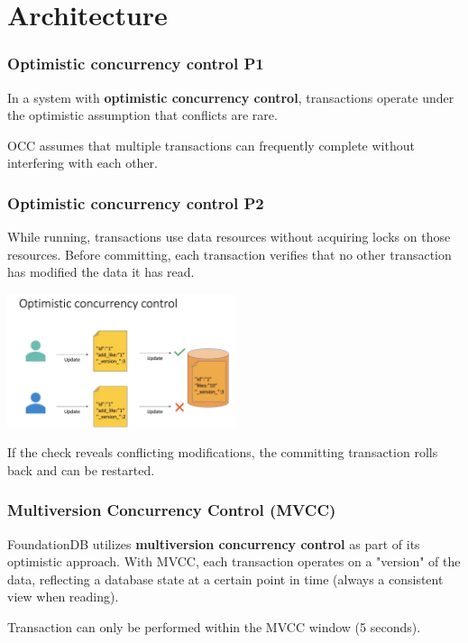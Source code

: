 \section{Architecture}

\begin{frame}
	\frametitle{Optimistic concurrency control P1}
 In a system with \textbf{optimistic concurrency control}, transactions operate under the optimistic assumption that conflicts are rare. 
\vspace{0.5cm}

 OCC assumes that multiple transactions can frequently complete without interfering with each other.
\end{frame}

\begin{frame}
	\frametitle{Optimistic concurrency control P2}
While running, transactions use data resources without acquiring locks on those resources. Before committing, each transaction verifies that no other transaction has modified the data it has read. 
\vspace{0.2cm}

\begin{center}
    \includegraphics[width=0.5\textwidth]{img/2-Architecture/Optimistic Concurrency Control.png}
\end{center}

If the check reveals conflicting modifications, the committing transaction rolls back and can be restarted.


\end{frame}

\begin{frame}
	\frametitle{Multiversion Concurrency Control (MVCC)}
  FoundationDB utilizes \textbf{multiversion concurrency control} as part of its optimistic approach. With MVCC, each transaction operates on a "version" of the data, reflecting a database state at a certain point in time (always a consistent view when reading).
  \vspace{0.5cm}
  
  Transaction can only be performed within the MVCC window (5 seconds).
\end{frame}



